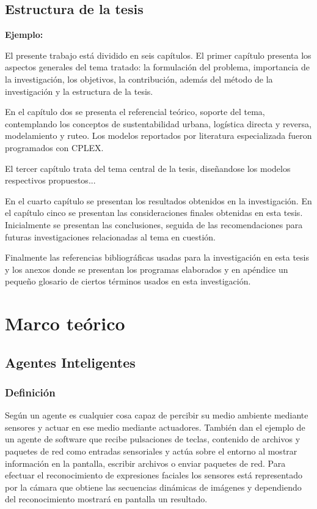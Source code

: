 \section{Estructura de la tesis}

{\bf Ejemplo:}\par
\vskip 0.1cm
El presente trabajo está dividido en seis capítulos. El primer capítulo presenta los aspectos generales del tema tratado: la formulación del problema, importancia de la investigación, los objetivos, la contribución, además del método de la investigación y la estructura de la tesis.

En el capítulo dos se presenta el referencial teórico, soporte del tema, contemplando los conceptos de sustentabilidad urbana, logística directa y reversa, modelamiento y ruteo. Los modelos reportados por literatura especializada fueron programados con CPLEX.

El tercer capítulo trata del tema central de la tesis, diseñandose los modelos respectivos propuestos...   

 En el cuarto capítulo se presentan los resultados obtenidos en la investigación. En el capítulo cinco se presentan las consideraciones finales obtenidas en esta tesis. Inicialmente se presentan las conclusiones, seguida de las recomendaciones para futuras investigaciones relacionadas al tema en cuestión.

Finalmente las referencias bibliográficas usadas para la investigación en esta tesis y los anexos donde se presentan los programas elaborados y en apéndice un pequeño glosario de ciertos términos usados en esta investigación.




\chapter{Marco teórico}

\section{Agentes Inteligentes}
\subsection{Definición}

Según \cite{Russel} un agente es cualquier cosa capaz de percibir su medio ambiente mediante sensores y actuar en ese medio mediante actuadores. También dan el ejemplo de  un agente de software que recibe pulsaciones de teclas, contenido de archivos y paquetes de red como entradas sensoriales y actúa sobre el entorno al mostrar información en la pantalla, escribir archivos o enviar paquetes de red. Para efectuar el reconocimiento de expresiones faciales los sensores está representado por la cámara que obtiene las secuencias dinámicas de imágenes y dependiendo del reconocimiento mostrará en pantalla un resultado.

